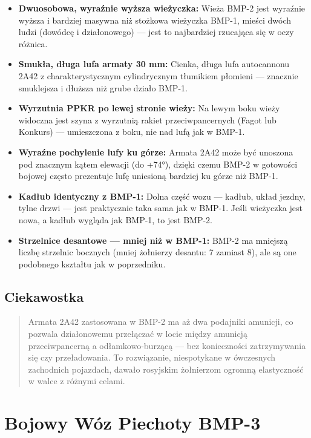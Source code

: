 \documentclass[12pt,oneside]{book}
\providecommand{\tightlist}{%
  \setlength{\itemsep}{0pt}\setlength{\parskip}{0pt}}
\begin{document}
\begin{itemize}
\tightlist
\item
  \textbf{Dwuosobowa, wyraźnie wyższa wieżyczka:} Wieża BMP-2 jest
  wyraźnie wyższa i bardziej masywna niż stożkowa wieżyczka BMP-1,
  mieści dwóch ludzi (dowódcę i działonowego) --- jest to najbardziej
  rzucająca się w oczy różnica.
\item
  \textbf{Smukła, długa lufa armaty 30 mm:} Cienka, długa lufa
  autocannonu 2A42 z charakterystycznym cylindrycznym tłumikiem płomieni
  --- znacznie smuklejsza i dłuższa niż grube działo BMP-1.
\item
  \textbf{Wyrzutnia PPKR po lewej stronie wieży:} Na lewym boku wieży
  widoczna jest szyna z wyrzutnią rakiet przeciwpancernych (Fagot lub
  Konkurs) --- umieszczona z boku, nie nad lufą jak w BMP-1.
\item
  \textbf{Wyraźne pochylenie lufy ku górze:} Armata 2A42 może być
  unoszona pod znacznym kątem elewacji (do +74°), dzięki czemu BMP-2 w
  gotowości bojowej często prezentuje lufę uniesioną bardziej ku górze
  niż BMP-1.
\item
  \textbf{Kadłub identyczny z BMP-1:} Dolna część wozu --- kadłub, układ
  jezdny, tylne drzwi --- jest praktycznie taka sama jak w BMP-1. Jeśli
  wieżyczka jest nowa, a kadłub wygląda jak BMP-1, to jest BMP-2.
\item
  \textbf{Strzelnice desantowe --- mniej niż w BMP-1:} BMP-2 ma mniejszą
  liczbę strzelnic bocznych (mniej żołnierzy desantu: 7 zamiast 8), ale
  są one podobnego kształtu jak w poprzedniku.
\end{itemize}

\subsection{Ciekawostka}\label{ciekawostka-12}

\begin{quote}
Armata 2A42 zastosowana w BMP-2 ma aż dwa podajniki amunicji, co pozwala
działonowemu przełączać w locie między amunicją przeciwpancerną a
odłamkowo-burzącą --- bez konieczności zatrzymywania się czy
przeładowania. To rozwiązanie, niespotykane w ówczesnych zachodnich
pojazdach, dawało rosyjskim żołnierzom ogromną elastyczność w walce z
różnymi celami.
\end{quote}

\section{Bojowy Wóz Piechoty BMP-3}\label{bojowy-wuxf3z-piechoty-bmp-3}
\end{document}
